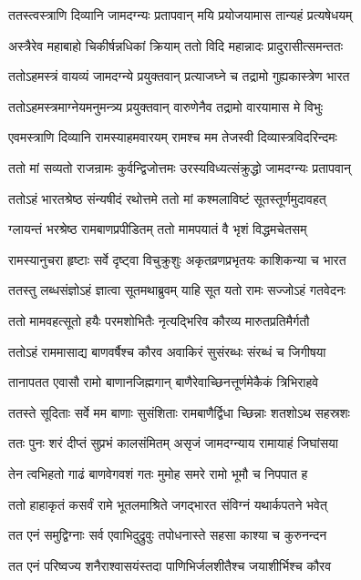 \threelineshloka
{ततस्त्वस्त्राणि दिव्यानि जामदग्न्यः प्रतापवान्}
{मयि प्रयोजयामास तान्यहं प्रत्यषेधयम्}
{}


\twolineshloka
{अस्त्रैरेव महाबाहो चिकीर्षन्नधिकां क्रियाम्}
{ततो विदि महान्नादः प्रादुरासीत्समन्ततः}


\twolineshloka
{ततोऽहमस्त्रं वायव्यं जामदग्न्ये प्रयुक्तवान्}
{प्रत्याजघ्ने च तद्रामो गुह्यकास्त्रेण भारत}


\twolineshloka
{ततोऽहमस्त्रमाग्नेयमनुमन्त्र्य प्रयुक्तवान्}
{वारुणेनैव तद्रामो वारयामास मे विभुः}


\twolineshloka
{एवमस्त्राणि दिव्यानि रामस्याहमवारयम्}
{रामश्च मम तेजस्वी दिव्यास्त्रविदरिन्दमः}


\twolineshloka
{ततो मां सव्यतो राजन्रामः कुर्वन्द्विजोत्तमः}
{उरस्यविध्यत्संक्रुद्धो जामदग्न्यः प्रतापवान्}


\twolineshloka
{ततोऽहं भारतश्रेष्ठ संन्यषीदं रथोत्तमे}
{ततो मां कश्मलाविष्टं सूतस्तूर्णमुदावहत्}


\twolineshloka
{ग्लायन्तं भरश्रेष्ठ रामबाणप्रपीडितम्}
{ततो मामपयातं वै भृशं विद्धमचेतसम्}


\twolineshloka
{रामस्यानुचरा हृष्टाः सर्वे दृष्ट्वा विचुक्रुशुः}
{अकृतव्रणप्रभृतयः काशिकन्या च भारत}


\twolineshloka
{ततस्तु लब्धसंज्ञोऽहं ज्ञात्वा सूतमथाब्रुवम्}
{याहि सूत यतो रामः सज्जोऽहं गतवेदनः}


\twolineshloka
{ततो मामवहत्सूतो हयैः परमशोभितैः}
{नृत्यद्भिरिव कौरव्य मारुतप्रतिमैर्गतौ}


\twolineshloka
{ततोऽहं राममासाद्य बाणवर्षैश्च कौरव}
{अवाकिरं सुसंरब्धः संरब्धं च जिगीषया}


\twolineshloka
{तानापतत एवासौ रामो बाणानजिह्मगान्}
{बाणैरेवाच्छिनत्तूर्णमेकैकं त्रिभिराहवे}


\twolineshloka
{ततस्ते सूदिताः सर्वे मम बाणाः सुसंशिताः}
{रामबाणैर्द्विधा च्छिन्नाः शतशोऽथ सहस्रशः}


\twolineshloka
{ततः पुनः शरं दीप्तं सुप्रभं कालसंमितम्}
{असृजं जामदग्न्याय रामायाहं जिघांसया}


\twolineshloka
{तेन त्वभिहतो गाढं बाणवेगवशं गतः}
{मुमोह समरे रामो भूमौ च निपपात ह}


\twolineshloka
{ततो हाहाकृतं कसर्वं रामे भूतलमाश्रिते}
{जगद्भारत संविग्नं यथार्कपतने भवेत्}


\twolineshloka
{तत एनं समुद्विग्नाः सर्व एवाभिदुद्रुवुः}
{तपोधनास्ते सहसा काश्या च कुरुनन्दन}


\twolineshloka
{तत एनं परिष्वज्य शनैराश्वासयंस्तदा}
{पाणिभिर्जलशीतैश्च जयाशीर्भिश्च कौरव}



